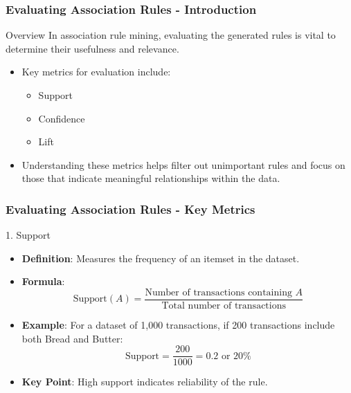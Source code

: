 \documentclass[aspectratio=169]{beamer}
\begin{document}
\begin{frame}[fragile]
    \frametitle{Evaluating Association Rules - Introduction}
    \begin{block}{Overview}
        In association rule mining, evaluating the generated rules is vital to determine their usefulness and relevance. 
    \end{block}
    \begin{itemize}
        \item Key metrics for evaluation include:
        \begin{itemize}
            \item Support
            \item Confidence
            \item Lift
        \end{itemize}
        \item Understanding these metrics helps filter out unimportant rules and focus on those that indicate meaningful relationships within the data.
    \end{itemize}
\end{frame}

\begin{frame}[fragile]
    \frametitle{Evaluating Association Rules - Key Metrics}
    \begin{block}{1. Support}
        \begin{itemize}
            \item \textbf{Definition}: Measures the frequency of an itemset in the dataset.
            \item \textbf{Formula}:
            \begin{equation}
                \text{Support}(A) = \frac{\text{Number of transactions containing } A}{\text{Total number of transactions}}
            \end{equation}
            \item \textbf{Example}: 
            For a dataset of 1,000 transactions, if 200 transactions include both {Bread} and {Butter}:
            \begin{equation}
                \text{Support} = \frac{200}{1000} = 0.2 \text{ or } 20\%
            \end{equation}
            \item \textbf{Key Point}: High support indicates reliability of the rule.
        \end{itemize}
    \end{block}
\end{frame}
\end{document}
